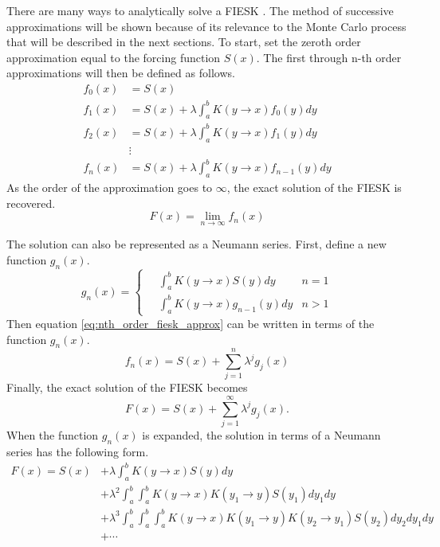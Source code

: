 There are many ways to analytically solve a FIESK 
\citep{rahman_integral_2007, morse_methods_1953}. The method of 
successive approximations will be shown because of its relevance to the
Monte Carlo process that will be described in the next sections. To start,
set the zeroth order approximation equal to the forcing function $S(x)$. The
first through n-th order approximations will then be defined as follows.
\begin{align}
  f_0(x) & = S(x) \nonumber \\
  f_1(x) & = S(x) + \lambda \int_a^b K(y \to x)f_0(y)dy \nonumber \\
  f_2(x) & = S(x) + \lambda \int_a^b K(y \to x)f_1(y)dy \nonumber \\
  & \vdots \nonumber \\
  f_n(x) & = S(x) + \lambda \int_a^b K(y \to x)f_{n-1}(y)dy 
  \label{eq:nth_order_fiesk_approx} 
\end{align}
As the order of the approximation goes to $\infty$, the exact solution of
the FIESK is recovered.
\begin{equation}
  F(x) = \lim_{n \to \infty} f_n(x)
\end{equation}

The solution can also be represented as a Neumann series. First, define a new
function $g_n(x)$.
\begin{equation}
  g_n(x) = 
  \begin{cases}
    \quad \int_a^b K(y \to x) S(y)dy & n = 1 \\
    \quad \int_a^b K(y \to x) g_{n-1}(y)dy & n > 1 
  \end{cases}
\end{equation}
Then equation \ref{eq:nth_order_fiesk_approx} can be written in terms of the 
function $g_n(x)$.
\begin{equation}
  f_n(x) = S(x) + \sum_{j=1}^n \lambda^j g_j(x)
\end{equation}
Finally, the exact solution of the FIESK becomes
\begin{equation}
  F(x) = S(x) + \sum_{j=1}^{\infty} \lambda^j g_j(x).
\end{equation}
When the function $g_n(x)$ is expanded, the solution in terms of a Neumann 
series has the following form.
\begin{equation}
  \begin{split}
    F(x) = S(x) &+ \lambda \int_a^b K(y \to x)S(y)dy \\
    & + \lambda^2 \int_a^b \int_a^b K(y \to x)K(y_1 \to y)S(y_1)dy_1dy \\
    & + \lambda^3 \int_a^b \int_a^b \int_a^b K(y \to x)K(y_1 \to y)K(y_2 \to y_1)
    S(y_2)dy_2dy_1dy \\
    & + \cdots 
  \end{split}
  \label{eq:neumann_series_soln_expansion}
\end{equation}

